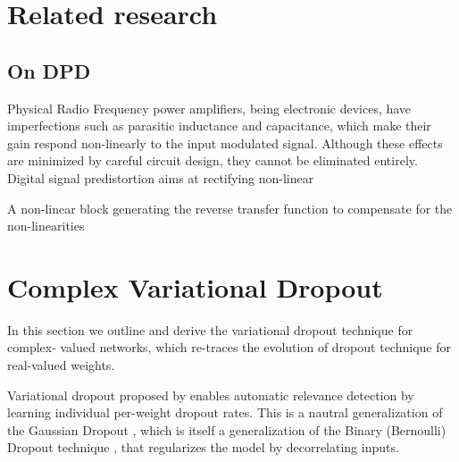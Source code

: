 \documentclass[a4paper,10pt]{article}
\begin{document}


\section{Related research} %
\label{sec:realted_research}

\subsection{On DPD} %
\label{sub:on_dpd}

Physical Radio Frequency power amplifiers, being electronic devices, have imperfections
such as parasitic inductance and capacitance, which make their gain respond non-linearly
to the input modulated signal. Although these effects are minimized by careful circuit
design, they cannot be eliminated entirely. Digital signal predistortion aims at rectifying
non-linear

 A non-linear block generating the reverse transfer
    function to compensate for the non-linearities



\section{Complex Variational Dropout} %
\label{sec:complex_varaitional_dropout}

In this section we outline and derive the variational dropout technique for complex-%
valued networks, which re-traces the evolution of dropout technique for real-valued
weights.

Variational dropout proposed by \cite{kingma_variational_2015} enables automatic relevance
detection by learning individual per-weight dropout rates. This is a nautral generalization
of the Gaussian Dropout \cite{srivastava_dropout_2014,wang_fast_2013}, which is itself a
generalization of the Binary (Bernoulli) Dropout technique \cite{hinton_improving_2012},
that regularizes the model by decorrelating inputs.
\end{document}
